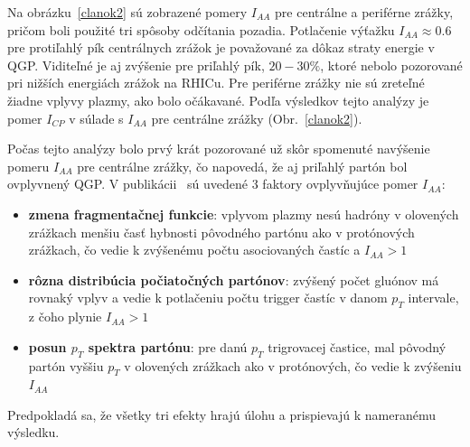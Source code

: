 \documentclass[thesismargins, thesislinespacing]{rnthesis}
\begin{document}
Na obrázku~\ref{clanok2} sú zobrazené pomery $I_{AA}$ pre centrálne a periférne zrážky, pričom boli použité tri spôsoby odčítania pozadia. Potlačenie výťažku $I_{AA}\approx0.6$ pre protiľahlý pík centrálnych zrážok je považované za dôkaz straty energie v QGP. Viditeľné je aj zvýšenie pre priľahlý pík, $20-30\%$, ktoré nebolo pozorované pri nižších energiách zrážok na RHICu. Pre periférne zrážky nie sú zreteľné žiadne vplyvy plazmy, ako bolo očákavané. Podľa výsledkov tejto analýzy je pomer $I_{CP}$ v súlade s $I_{AA}$ pre centrálne zrážky (Obr.~\ref{clanok2}).



Počas tejto analýzy bolo prvý krát pozorované už skôr spomenuté navýšenie pomeru $I_{AA}$ pre centrálne zrážky, čo napovedá, že aj priľahlý partón bol ovplyvnený QGP. V publikácii~\cite{clanok} sú uvedené 3 faktory ovplyvňujúce pomer $I_{AA}$:
\begin{itemize}
	\item \textbf{zmena fragmentačnej funkcie}: vplyvom plazmy nesú hadróny v olovených zrážkach menšiu časť hybnosti pôvodného partónu ako v protónových zrážkach, čo vedie k zvýšenému počtu asociovaných častíc a $I_{AA}>1$
	\item \textbf{rôzna distribúcia počiatočných partónov}: zvýšený počet gluónov má rovnaký vplyv a vedie k potlačeniu počtu trigger častíc v danom $p_T$ intervale, z čoho plynie $I_{AA}>1$
	\item \textbf{posun $p_T$ spektra partónu}: pre danú $p_T$ trigrovacej častice, mal pôvodný partón vyššiu $p_T$ v olovených zrážkach ako v protónových, čo vedie k zvýšeniu $I_{AA}$
\end{itemize}

Predpokladá sa, že všetky tri efekty hrajú úlohu a prispievajú k nameranému výsledku.
\end{document}
